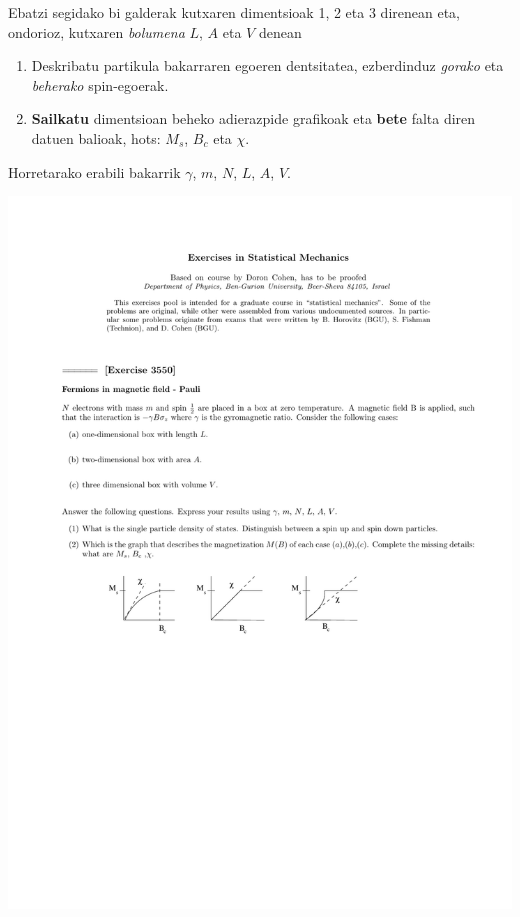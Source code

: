 \documentclass[10pt]{article}              %
\begin{document}
\begin{enumerate}
Ebatzi segidako bi galderak kutxaren dimentsioak 1, 2 eta 3 direnean eta, ondorioz, kutxaren \textit{bolumena} $L$, $A$ eta $V$ denean

\begin{enumerate}
\item Deskribatu partikula bakarraren egoeren dentsitatea, ezberdinduz \textit{gorako} eta \textit{beherako} spin-egoerak.
\item \textbf{Sailkatu} dimentsioan beheko adierazpide grafikoak eta \textbf{bete} falta diren datuen balioak, hots: $M_{s}$, $B_{c}$ eta $\chi$.
\end{enumerate}

\noindent Horretarako erabili bakarrik $\gamma$, $m$, $N$, $L$, $A$, $V$.


\end{enumerate}

\begin{center}
\includegraphics[width=14.2cm]{1PAzterketaPartzialaIrudia.pdf}
\end{center}
\end{document}
